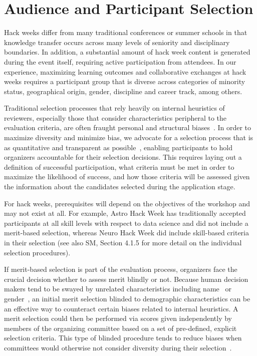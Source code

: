 \section*{Audience and Participant Selection}

Hack weeks differ from many traditional conferences or summer schools in that knowledge transfer occurs across many levels of seniority and disciplinary boundaries.
In addition, a substantial amount of hack week content is generated during the event itself, requiring active participation from attendees.
In our experience, maximizing learning outcomes and collaborative exchanges at hack weeks requires a participant group that is diverse across categories of minority status, geographical origin, gender, discipline and career track, among others. 

Traditional selection processes that rely heavily on internal heuristics of reviewers, especially those that consider characteristics peripheral to the evaluation criteria, are often fraught personal and structural biases~\cite[e.g.][]{sunstein2015wiser}. 
In order to maximize diversity and minimize bias, we advocate for a selection process that is as quantitative and transparent as possible~\cite{sunstein2015wiser}, enabling participants to hold organizers accountable for their selection decisions.
This requires laying out a definition of successful participation, what criteria must be met in order to maximize the likelihood of success, and how those criteria will be assessed given the information about the candidates selected during the application stage.  

For hack weeks, prerequisites will depend on the objectives of the workshop and may not exist at all. For example, Astro Hack Week has traditionally accepted participants at all skill levels with respect to data science and did not include a merit-based selection, whereas Neuro Hack Week did include skill-based criteria in their selection (see also SM, Section 4.1.5 for more detail on the individual selection procedures). 

If merit-based selection is part of the evaluation process, organizers face the crucial decision whether to assess merit blindly or not. Because human decision makers tend to be swayed by unrelated characteristics including name~\cite{bertrand2004} or gender~\cite{mossracusin2012}, an initial merit selection blinded to demographic characteristics can be an effective way to counteract certain biases related to internal heuristics. A merit selection could then be performed via scores given independently by members of the organizing committee based on a set of pre-defined, explicit selection criteria. This type of blinded procedure tends to reduce biases when committees would otherwise not consider diversity during their selection~\cite{bohnet2016}. 

